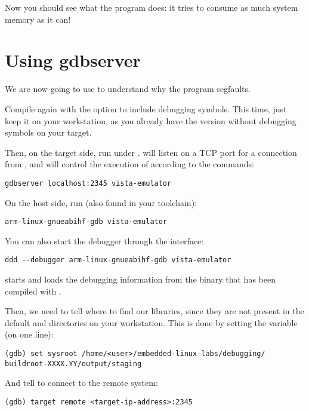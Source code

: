 Now you should see what the program does: it tries to consume as much
system memory as it can!

\section{Using gdbserver}

We are now going to use  to understand why the program
segfaults.

Compile  again with the  option to
include debugging symbols. This time, just keep it on your workstation,
as you already have the version without debugging symbols on your target.

Then, on the target side, run  under
.  will listen on a TCP port for a
connection from , and will control the execution of
 according to the  commands:

\begin{verbatim}
gdbserver localhost:2345 vista-emulator
\end{verbatim}

On the host side, run  (also found in your toolchain):
\begin{verbatim}
arm-linux-gnueabihf-gdb vista-emulator
\end{verbatim}

You can also start the debugger through the  interface:
\begin{verbatim}
ddd --debugger arm-linux-gnueabihf-gdb vista-emulator
\end{verbatim}

 starts and loads the debugging information from the
 binary that has been compiled with .

Then, we need to tell where to find our libraries, since they are not
present in the default  and  directories on
your workstation. This is done by setting the  
variable (on one line):

\begin{verbatim}
(gdb) set sysroot /home/<user>/embedded-linux-labs/debugging/
buildroot-XXXX.YY/output/staging
\end{verbatim}

And tell  to connect to the remote system:
\begin{verbatim}
(gdb) target remote <target-ip-address>:2345
\end{verbatim}

